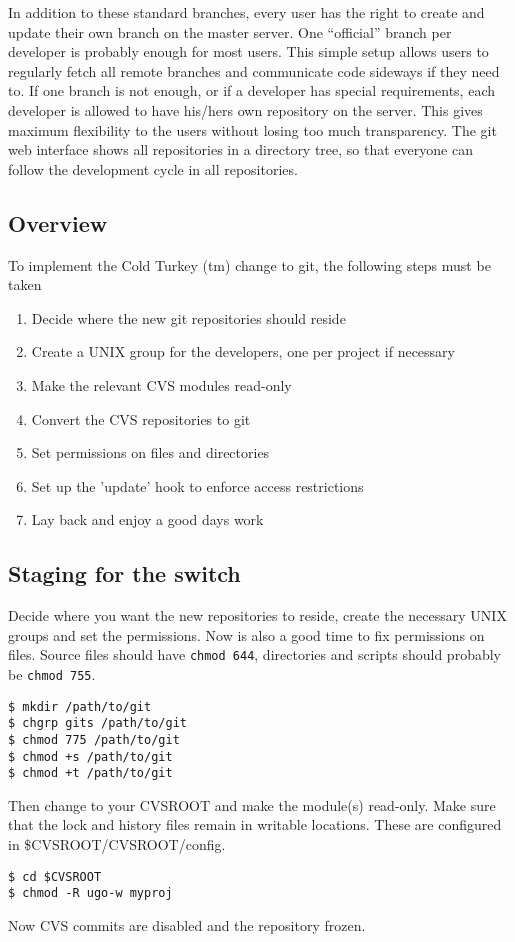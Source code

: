 \documentclass[a4paper,10pt]{article}
\begin{document}
In addition to these standard branches, every user has the right to create and
update their own branch on the master server. One ``official'' branch per
developer is probably enough for most users. This simple setup allows users to
regularly fetch all remote branches and communicate code sideways if they need
to. If one branch is not enough, or if a developer has special requirements,
each developer is allowed to have his/hers own repository on the server. This
gives maximum flexibility to the users without losing too much transparency.
The git web interface shows all repositories in a directory tree, so that
everyone can follow the development cycle in all repositories.

\subsection{Overview}
To implement the Cold Turkey (tm) change to git, the following steps must be
taken
\begin{enumerate}
  \item Decide where the new git repositories should reside
  \item Create a UNIX group for the developers, one per project if necessary
  \item Make the relevant CVS modules read-only 
  \item Convert the CVS repositories to git
  \item Set permissions	on files and directories
  \item Set up the 'update' hook to enforce access restrictions
  \item Lay back and enjoy a good days work	
\end{enumerate}

\subsection{Staging for the switch}
Decide where you want the new repositories to reside, create the necessary
UNIX groups and set the permissions. Now is also a good time to fix
permissions on files. Source files should have {\tt chmod 644}, directories
and scripts should probably be {\tt chmod 755}.
\begin{verbatim}
$ mkdir /path/to/git
$ chgrp gits /path/to/git
$ chmod 775 /path/to/git
$ chmod +s /path/to/git
$ chmod +t /path/to/git
\end{verbatim}

Then change to your CVSROOT and make the module(s) read-only. Make sure that
the lock and history files remain in writable locations. These are configured
in \$CVSROOT/CVSROOT/config.
\begin{verbatim}
$ cd $CVSROOT
$ chmod -R ugo-w myproj
\end{verbatim}
Now CVS commits are disabled and the repository frozen.
\end{document}
